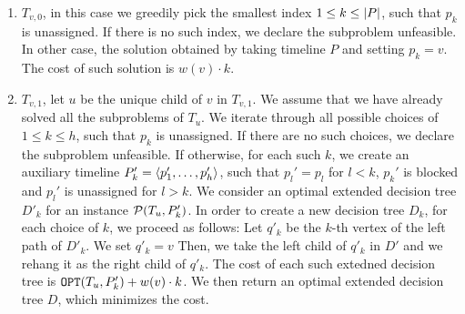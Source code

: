     \begin{enumerate}
        \item $T_{v,0}$, in this case we greedily pick the smallest index $1 \leq k \leq \mathopen{}\left| P \right|$, such that $p_k$ is unassigned. If there is no such index, we declare the subproblem unfeasible. In other case, the solution obtained by taking timeline $P$ and setting $p_k=v$. The cost of such solution is $w(v)\cdot k$.
        \item $T_{v,1}$, let $u$ be the unique child of $v$ in $T_{v,1}$. We assume that we have already solved all the subproblems of $T_u$.
        We iterate through all possible choices of $1\leq k \leq h$, such that $p_k$ is unassigned. If there are no such choices, we declare the subproblem unfeasible. If otherwise, for each such $k$, we create an auxiliary timeline $P_k'=
        \mathopen{}\langle p_1',\dots,p_h' \rangle$, such that $p_l'=p_l$ for $l < k$, $p_k'$ is blocked and $p_l'$ is unassigned for $l>k$. We consider an optimal extended decision tree $D'_k$ for an instance $\mathcal{P}\mathopen{}\left( T_{u}, P_k' \right)$. In order to create a new decision tree $D_k$, for each choice of $k$, we proceed as follows: Let $q'_k$ be the $k$-th vertex of the left path of $D'_k$. We set $q'_k=v$ Then, we take the left child of $q'_k$ in $D'$ and we rehang it as the right child of $q'_k$.
        The cost of each such extedned decision tree is $\texttt{OPT}\mathopen{}\left( T_{u}, P_k' \right)+w(v)\cdot k$. We then return an optimal extended decision tree $D$, which minimizes the cost.

\end{enumerate}

